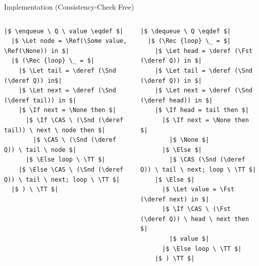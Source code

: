 \documentclass[9pt,xcolor={dvipsnames}]{beamer}
\newcommand{\enqueue}{\operatorname{enqueue}}
\newcommand{\dequeue}{\operatorname{dequeue}}
\begin{document}
\begin{frame}[fragile]{Implementation (Consistency-Check Free)}
\begin{columns}[t]
\begin{column}{0.5\textwidth}
\begin{verbatim}
|$ \enqueue \ Q \ value \eqdef $|
  |$ \Let node = \Ref(\Some value, \Ref(\None)) in $|
  |$ (\Rec {loop} \_ = $|
    |$ \Let tail = \deref (\Snd (\deref Q)) in$|
    |$ \Let next = \deref (\Snd (\deref tail)) in $|
    |$ \If next = \None then $|
      |$ \If \CAS \ (\Snd (\deref tail)) \ next \ node then $|
        |$ \CAS \ (\Snd (\deref Q)) \ tail \ node $|
      |$ \Else loop \ \TT $|
    |$ \Else \CAS \ (\Snd (\deref Q)) \ tail \ next; loop \ \TT $|
  |$ ) \ \TT $|
      \end{verbatim}
    \end{column}
    \begin{column}{0.5\textwidth}
      \begin{verbatim}
|$ \dequeue \ Q \eqdef $|
  |$ (\Rec {loop} \_ = $|
    |$ \Let head = \deref (\Fst (\deref Q)) in $|
    |$ \Let tail = \deref (\Snd (\deref Q)) in $|
    |$ \Let next = \deref (\Snd (\deref head)) in $|
    |$ \If head = tail then $|
      |$ \If next = \None then $|
        |$ \None $|
      |$ \Else $|
        |$ \CAS (\Snd (\deref Q)) \ tail \ next; loop \ \TT $|
    |$ \Else $|
      |$ \Let value = \Fst (\deref next) in $|
      |$ \If \CAS \ (\Fst (\deref Q)) \ head \ next then $|
        |$ value $|
      |$ \Else loop \ \TT $|
    |$ ) \TT $|
        \end{verbatim}
    \end{column}
  \end{columns}
\end{frame}
\end{document}

